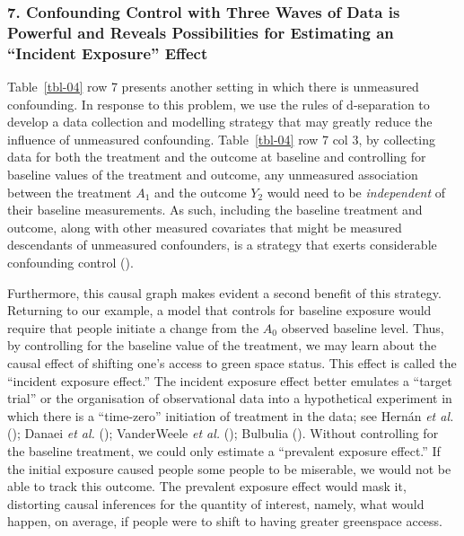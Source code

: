 \documentclass[
  singlecolumn]{article}
\begin{document}
\subsubsection{7. Confounding Control with Three Waves of Data is
Powerful and Reveals Possibilities for Estimating an ``Incident
Exposure''
Effect}\label{confounding-control-with-three-waves-of-data-is-powerful-and-reveals-possibilities-for-estimating-an-incident-exposure-effect}

Table~\ref{tbl-04} row 7 presents another setting in which there is
unmeasured confounding. In response to this problem, we use the rules of
d-separation to develop a data collection and modelling strategy that
may greatly reduce the influence of unmeasured confounding.
Table~\ref{tbl-04} row 7 col 3, by collecting data for both the
treatment and the outcome at baseline and controlling for baseline
values of the treatment and outcome, any unmeasured association between
the treatment \(A_1\) and the outcome \(Y_2\) would need to be
\emph{independent} of their baseline measurements. As such, including
the baseline treatment and outcome, along with other measured covariates
that might be measured descendants of unmeasured confounders, is a
strategy that exerts considerable confounding control
().

Furthermore, this causal graph makes evident a second benefit of this
strategy. Returning to our example, a model that controls for baseline
exposure would require that people initiate a change from the \(A_0\)
observed baseline level. Thus, by controlling for the baseline value of
the treatment, we may learn about the causal effect of shifting one's
access to green space status. This effect is called the ``incident
exposure effect.'' The incident exposure effect better emulates a
``target trial'' or the organisation of observational data into a
hypothetical experiment in which there is a ``time-zero'' initiation of
treatment in the data; see Hernán \emph{et al.}
(); Danaei \emph{et al.}
(); VanderWeele \emph{et al.}
(); Bulbulia
(). Without controlling for the
baseline treatment, we could only estimate a ``prevalent exposure
effect.'' If the initial exposure caused people some people to be
miserable, we would not be able to track this outcome. The prevalent
exposure effect would mask it, distorting causal inferences for the
quantity of interest, namely, what would happen, on average, if people
were to shift to having greater greenspace access.
\end{document}
